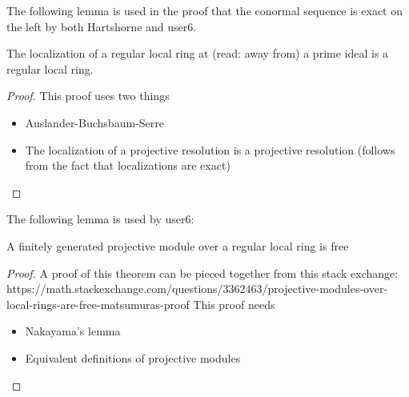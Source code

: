 The following lemma is used in the proof that the 
conormal sequence is exact on the left by both 
Hartshorne and user6.

\begin{lem}
	The localization of a regular local ring at (read: away from) a prime 
	ideal is a regular local ring.
\end{lem}

\begin{proof}
	This proof uses two things
	\begin{itemize}
		\item Auslander-Buchsbaum-Serre
		\item The localization of a projective resolution
			is a projective resolution
			(follows from the fact that localizations are exact)
	\end{itemize}
\end{proof}

The following lemma is used by user6:

\begin{lem}
	A finitely generated projective module 
	over a regular local ring is free
\end{lem}


\begin{proof}
	A proof of this theorem can be pieced together from this
	stack exchange:
	https://math.stackexchange.com/questions/3362463/projective-modules-over-local-rings-are-free-matsumuras-proof
	This proof needs
	\begin{itemize}
		\item Nakayama's lemma
		\item Equivalent definitions of projective modules
	\end{itemize}
\end{proof}




